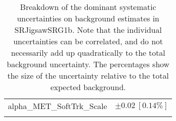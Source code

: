\begin{table}
\begin{center}
\begin{tabular*}{\textwidth}{@{\extracolsep{\fill}}lc}
alpha\_MET\_SoftTrk\_Scale         & $\pm 0.02\ [0.14\%] $       \\
\noalign{\smallskip}\hline\noalign{\smallskip}
\end{tabular*}
\end{center}
\caption[Breakdown of uncertainty on background estimates]{
Breakdown of the dominant systematic uncertainties on background estimates in SRJigsawSRG1b.
Note that the individual uncertainties can be correlated, and do not necessarily add up quadratically to 
the total background uncertainty. The percentages show the size of the uncertainty relative to the total expected background.
\label{table.results.bkgestimate.uncertainties.SRJigsawSRG1b}}
\end{table}
%